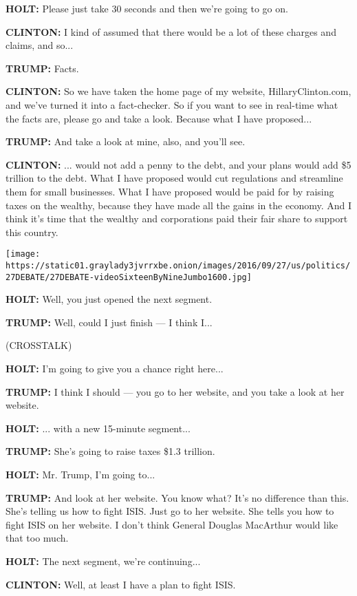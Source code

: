 \textbf{HOLT:} Please just take 30 seconds and then we're going to go
on.

\textbf{CLINTON:} I kind of assumed that there would be a lot of these
charges and claims, and so...

\textbf{TRUMP:} Facts.

\textbf{CLINTON:} So we have taken the home page of my website,
HillaryClinton.com, and we've turned it into a fact-checker. So if you
want to see in real-time what the facts are, please go and take a look.
Because what I have proposed...

\textbf{TRUMP:} And take a look at mine, also, and you'll see.

\textbf{CLINTON:} ... would not add a penny to the debt, and your plans
would add \$5 trillion to the debt. What I have proposed would cut
regulations and streamline them for small businesses. What I have
proposed would be paid for by raising taxes on the wealthy, because they
have made all the gains in the economy. And I think it's time that the
wealthy and corporations paid their fair share to support this country.

\texttt{[image: https://static01.graylady3jvrrxbe.onion/images/2016/09/27/us/politics/27DEBATE/27DEBATE-videoSixteenByNineJumbo1600.jpg]}

\textbf{HOLT:} Well, you just opened the next segment.

\textbf{TRUMP:} Well, could I just finish --- I think I...

(CROSSTALK)

\textbf{HOLT:} I'm going to give you a chance right here...

\textbf{TRUMP:} I think I should --- you go to her website, and you take
a look at her website.

\textbf{HOLT:} ... with a new 15-minute segment...

\textbf{TRUMP:} She's going to raise taxes \$1.3 trillion.

\textbf{HOLT:} Mr. Trump, I'm going to...

\textbf{TRUMP:} And look at her website. You know what? It's no
difference than this. She's telling us how to fight ISIS. Just go to her
website. She tells you how to fight ISIS on her website. I don't think
General Douglas MacArthur would like that too much.

\textbf{HOLT:} The next segment, we're continuing...

\textbf{CLINTON:} Well, at least I have a plan to fight ISIS.

